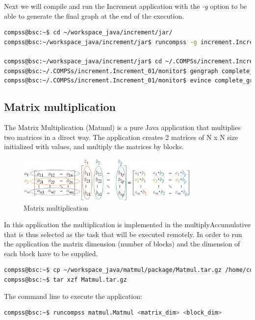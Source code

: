 Next we will compile and run the Increment application with the \textit{-g} option to be able to generate the final graph at the end of the execution.

\begin{lstlisting}[language=bash]
compss@bsc:~$ cd ~/workspace_java/increment/jar/
compss@bsc:~/workspace_java/increment/jar$ runcompss -g increment.Increment 10 1 2 3 

compss@bsc:~/workspace_java/increment/jar$ cd ~/.COMPSs/increment.Increment_01/monitor/
compss@bsc:~/.COMPSs/increment.Increment_01/monitor$ gengraph complete_graph.dot
compss@bsc:~/.COMPSs/increment.Increment_01/monitor$ evince complete_graph.dot.pdf
\end{lstlisting}

\subsection{Matrix multiplication}
The Matrix Multiplication (Matmul) is a pure Java application that multiplies two matrices in a direct way. 
The application creates 2 matrices of N x N size initialized with values, and multiply the matrices by blocks.

\begin{figure}[ht!]
  \centering
    \includegraphics[width=0.8\textwidth]{./Sections/2_Java/Figures/matrix.jpeg}
    \caption{Matrix multiplication} 
    \label{fig:matrix}
\end{figure}

In this application the multiplication is implemented in the multiplyAccumulative that is thus selected 
as the task that will be executed remotely. In order to run the application the matrix dimension (number of blocks) and the dimension of each block
have to be supplied.

\begin{lstlisting}[language=bash]
compss@bsc:~$ cp ~/workspace_java/matmul/package/Matmul.tar.gz /home/compss/
compss@bsc:~$ tar xzf Matmul.tar.gz
\end{lstlisting}

The command line to execute the application:

\begin{lstlisting}[language=bash]
compss@bsc:~$ runcompss matmul.Matmul <matrix_dim> <block_dim>
\end{lstlisting}

